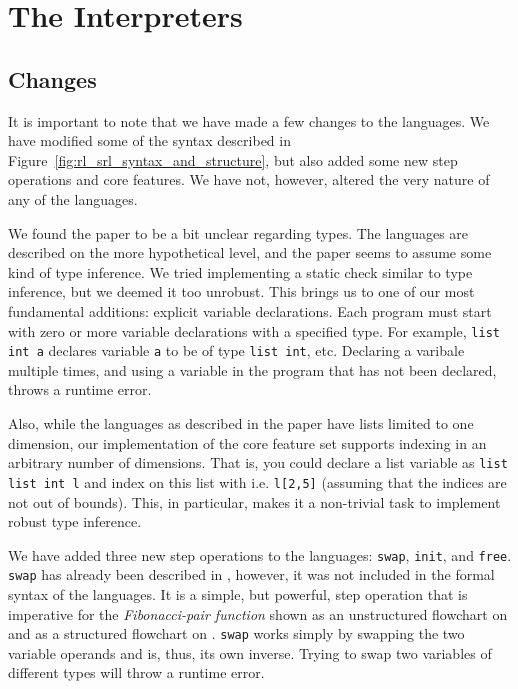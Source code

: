 
\section{The Interpreters}

\subsection{Changes}\label{sec:changes}

It is important to note that we have made a few changes to the languages. We have modified some of the syntax described in Figure~\ref{fig:rl_srl_syntax_and_structure}, but also added some new step operations and core features. We have not, however, altered the very nature of any of the languages.

We found the paper\cite{REV} to be a bit unclear regarding types. The languages are described on the more hypothetical level, and the paper seems to assume some kind of type inference. We tried implementing a static check similar to type inference, but we deemed it too unrobust. This brings us to one of our most fundamental additions: explicit variable declarations. Each program must start with zero or more variable declarations with a specified type. For example, \texttt{list int a} declares variable \texttt{a} to be of type \texttt{list int}, etc. Declaring a varibale multiple times, and using a variable in the program that has not been declared, throws a runtime error.

Also, while the languages as described in the paper have lists limited to one dimension, our implementation of the core feature set supports indexing in an arbitrary number of dimensions. That is, you could declare a list variable as \texttt{list list int l} and index on this list with i.e. \texttt{l[2,5]} (assuming that the indices are not out of bounds). This, in particular, makes it a non-trivial task to implement robust type inference.

We have added three new step operations to the languages: \texttt{swap}, \texttt{init}, and \texttt{free}. \texttt{swap} has already been described in \cite[p.~99]{REV}, however, it was not included in the formal syntax of the languages. It is a simple, but powerful, step operation that is imperative for the \textit{Fibonacci-pair function} shown as an unstructured flowchart on \cite[p.~99]{REV} and as a structured flowchart on \cite[p.~93]{REV}. \texttt{swap} works simply by swapping the two variable operands and is, thus, its own inverse. Trying to swap two variables of different types will throw a runtime error.


